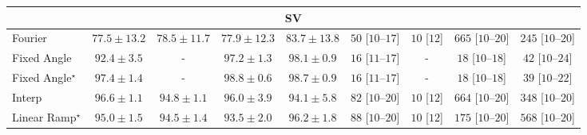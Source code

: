\begin{tabular}{l|cccc|cccc|}
\cline{1-9}
\multicolumn{9}{c}{\rule{0pt}{8pt}SV} \\
\midrule
Fourier & {\cellcolor[HTML]{FEF6FB}} \color[HTML]{000000} $77.5\pm 13.2$ & {\cellcolor[HTML]{F7F0F7}} \color[HTML]{000000} $78.5\pm 11.7$ & {\cellcolor[HTML]{FCF4FA}} \color[HTML]{000000} $77.9\pm 12.3$ & {\cellcolor[HTML]{C2CBE2}} \color[HTML]{000000} $83.7\pm 13.8$ & {\cellcolor[HTML]{FEEBE8}} \color[HTML]{000000} $50$ [$10$--$17$] & {\cellcolor[HTML]{FFF7F3}} \color[HTML]{000000} $10$ [$12$] & {\cellcolor[HTML]{49006A}} \color[HTML]{F1F1F1} $665$ [$10$--$20$] & {\cellcolor[HTML]{FAA3B6}} \color[HTML]{000000} $245$ [$10$--$20$] \\
Fixed Angle & {\cellcolor[HTML]{1B7EB7}} \color[HTML]{F1F1F1} $92.4\pm 3.5$ & {\cellcolor[HTML]{000000}} \color[HTML]{F1F1F1} {\cellcolor{white}} \color{black} - & {\cellcolor[HTML]{034E7B}} \color[HTML]{F1F1F1} $97.2\pm 1.3$ & {\cellcolor[HTML]{034369}} \color[HTML]{F1F1F1} $98.1\pm 0.9$ & {\cellcolor[HTML]{FFF6F2}} \color[HTML]{000000} $16$ [$11$--$17$] & {\cellcolor[HTML]{000000}} \color[HTML]{F1F1F1} {\cellcolor{white}} \color{black} - & {\cellcolor[HTML]{FFF5F1}} \color[HTML]{000000} $18$ [$10$--$18$] & {\cellcolor[HTML]{FEEEEB}} \color[HTML]{000000} $42$ [$10$--$24$] \\
Fixed Angle$^\star$ & {\cellcolor[HTML]{034B76}} \color[HTML]{F1F1F1} $97.4\pm 1.4$ & {\cellcolor[HTML]{000000}} \color[HTML]{F1F1F1} {\cellcolor{white}} \color{black} - & {\cellcolor[HTML]{023A5B}} \color[HTML]{F1F1F1} $98.8\pm 0.6$ & {\cellcolor[HTML]{023B5D}} \color[HTML]{F1F1F1} $98.7\pm 0.9$ & {\cellcolor[HTML]{FFF6F2}} \color[HTML]{000000} $16$ [$11$--$17$] & {\cellcolor[HTML]{000000}} \color[HTML]{F1F1F1} {\cellcolor{white}} \color{black} - & {\cellcolor[HTML]{FFF5F1}} \color[HTML]{000000} $18$ [$10$--$18$] & {\cellcolor[HTML]{FEEFEB}} \color[HTML]{000000} $39$ [$10$--$22$] \\
Interp & {\cellcolor[HTML]{045687}} \color[HTML]{F1F1F1} $96.6\pm 1.1$ & {\cellcolor[HTML]{0566A0}} \color[HTML]{F1F1F1} $94.8\pm 1.1$ & {\cellcolor[HTML]{045C90}} \color[HTML]{F1F1F1} $96.0\pm 3.9$ & {\cellcolor[HTML]{056CAA}} \color[HTML]{F1F1F1} $94.1\pm 5.8$ & {\cellcolor[HTML]{FDE3E0}} \color[HTML]{000000} $82$ [$10$--$20$] & {\cellcolor[HTML]{FFF7F3}} \color[HTML]{000000} $10$ [$12$] & {\cellcolor[HTML]{49006A}} \color[HTML]{F1F1F1} $664$ [$10$--$20$] & {\cellcolor[HTML]{F361A0}} \color[HTML]{F1F1F1} $348$ [$10$--$20$] \\
Linear Ramp$^\star$ & {\cellcolor[HTML]{04649E}} \color[HTML]{F1F1F1} $95.0\pm 1.5$ & {\cellcolor[HTML]{0569A4}} \color[HTML]{F1F1F1} $94.5\pm 1.4$ & {\cellcolor[HTML]{0771B1}} \color[HTML]{F1F1F1} $93.5\pm 2.0$ & {\cellcolor[HTML]{045B8E}} \color[HTML]{F1F1F1} $96.2\pm 1.8$ & {\cellcolor[HTML]{FDE1DE}} \color[HTML]{000000} $88$ [$10$--$20$] & {\cellcolor[HTML]{FFF7F3}} \color[HTML]{000000} $10$ [$12$] & {\cellcolor[HTML]{FCC5C0}} \color[HTML]{000000} $175$ [$10$--$20$] & {\cellcolor[HTML]{820178}} \color[HTML]{F1F1F1} $568$ [$10$--$20$] \\

\end{tabular}
